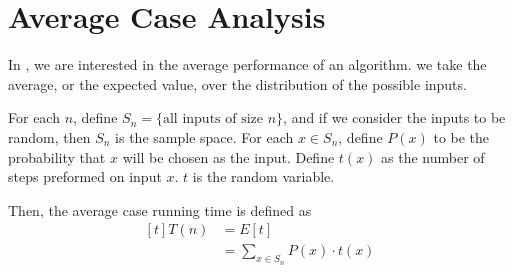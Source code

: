 \chapter{Average Case Analysis}

In , we are interested in the average performance of an algorithm. we take the average, or the expected value, over the distribution of the possible inputs. 

For each $n$, define $S_n = \{ \text{all inputs of size } n \}$, and if we consider the inputs to be random, then $S_n$ is the sample space. For each $x \in S_n$, define $P(x)$ to be the probability that $x$ will be chosen as the input. Define $t(x)$ as the number of steps preformed on input $x$. $t$ is the random variable. 

Then, the average case running time is defined as $$\begin{aligned}[t]
    T(n) & = E[t]                           \\
         & =\sum_{x \in S_n} P(x) \cdot t(x)
\end{aligned}$$

